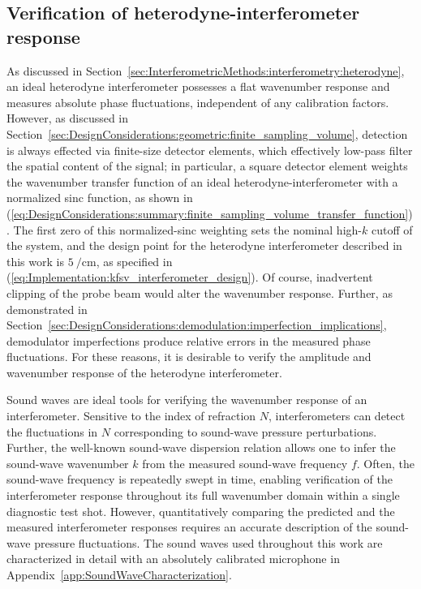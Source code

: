 \subsection{Verification of heterodyne-interferometer response}
\label{sec:Implementation:Calibration:interferometer}
As discussed in
Section~\ref{sec:InterferometricMethods:interferometry:heterodyne},
an ideal heterodyne interferometer
possesses a flat wavenumber response and
measures absolute phase fluctuations,
independent of any calibration factors.
However, as discussed in
Section~\ref{sec:DesignConsiderations:geometric:finite_sampling_volume},
detection is always effected via finite-size detector elements, which
effectively low-pass filter the spatial content of the signal;
in particular, a square detector element
weights the wavenumber transfer function
of an ideal heterodyne-interferometer
with a normalized sinc function, as shown in
(\ref{eq:DesignConsiderations:summary:finite_sampling_volume_transfer_function}).
The first zero of this normalized-sinc weighting
sets the nominal high-$k$ cutoff of the system, and
the design point for the heterodyne interferometer described in this work
is $\SI{5}{\per\centi\meter}$, as specified in
(\ref{eq:Implementation:kfsv_interferometer_design}).
Of course, inadvertent clipping of the probe beam
would alter the wavenumber response.
Further, as demonstrated in
Section~\ref{sec:DesignConsiderations:demodulation:imperfection_implications},
demodulator imperfections produce relative errors
in the measured phase fluctuations.
For these reasons, it is desirable
to verify the amplitude and wavenumber response
of the heterodyne interferometer.

Sound waves are ideal tools for verifying
the wavenumber response of an interferometer.
Sensitive to the index of refraction $N$,
interferometers can detect the fluctuations in $N$
corresponding to sound-wave pressure perturbations.
Further, the well-known sound-wave dispersion relation
allows one to infer the sound-wave wavenumber $k$
from the measured sound-wave frequency $f$.
Often, the sound-wave frequency is repeatedly swept in time,
enabling verification of the interferometer response
throughout its full wavenumber domain
within a single diagnostic test shot.
However, quantitatively comparing
the predicted and the measured interferometer responses
requires an accurate description of the sound-wave pressure fluctuations.
The sound waves used throughout this work
are characterized in detail with an absolutely calibrated microphone
in Appendix~\ref{app:SoundWaveCharacterization}.

